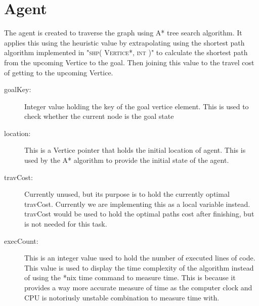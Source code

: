 \section{Agent}
The agent is created to traverse the graph using A* tree search algorithm. It
applies this using the heuristic value by extrapolating using the shortest path
algorithm implemented in "\textsc{shp( Vertice*, int )}" to calculate the
shortest path from the upcoming Vertice to the goal. Then joining this value to the
travel cost of getting to the upcoming Vertice.

\begin{description}
\item[goalKey:]		Integer value holding the key of the goal vertice element.
	This is used to check whether the current node is the goal state
\item[location:]	This is a Vertice pointer that holds the initial location of 
	agent.  This is used by the A* algorithm to provide the initial state of the
	agent.
\item[travCost:]	Currently unused, but its purpose is to hold the currently
	optimal travCost. Currently we are implementing this as a local variable
	instead.  travCost would be used to hold the optimal paths cost after
	finishing, but is not needed for this task.
\item[execCount:]	This is an integer value used to hold the number of executed
	lines of code. This value is used to display the time complexity of the
	algorithm instead of using the *nix time command to measure time.  This is
	because it provides a way more accurate measure of time as the computer clock
	and CPU is notoriusly unstable combination to measure time with.
\end{description}

